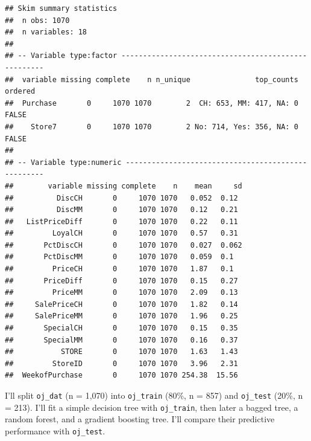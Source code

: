 \documentclass[]{book}
\newenvironment{Shaded}{\begin{snugshade}}{\end{snugshade}}
\newcommand{\DataTypeTok}[1]{\textcolor[rgb]{0.13,0.29,0.53}{#1}}
\newcommand{\DecValTok}[1]{\textcolor[rgb]{0.00,0.00,0.81}{#1}}
\newcommand{\FloatTok}[1]{\textcolor[rgb]{0.00,0.00,0.81}{#1}}
\newcommand{\KeywordTok}[1]{\textcolor[rgb]{0.13,0.29,0.53}{\textbf{#1}}}
\newcommand{\NormalTok}[1]{#1}
\newcommand{\OperatorTok}[1]{\textcolor[rgb]{0.81,0.36,0.00}{\textbf{#1}}}
\newcommand{\OtherTok}[1]{\textcolor[rgb]{0.56,0.35,0.01}{#1}}
\newcommand{\StringTok}[1]{\textcolor[rgb]{0.31,0.60,0.02}{#1}}
\begin{document}
\begin{verbatim}
## Skim summary statistics
##  n obs: 1070 
##  n variables: 18 
## 
## -- Variable type:factor ----------------------------------------------------
##  variable missing complete    n n_unique               top_counts ordered
##  Purchase       0     1070 1070        2  CH: 653, MM: 417, NA: 0   FALSE
##    Store7       0     1070 1070        2 No: 714, Yes: 356, NA: 0   FALSE
## 
## -- Variable type:numeric ---------------------------------------------------
##        variable missing complete    n    mean     sd
##          DiscCH       0     1070 1070   0.052  0.12 
##          DiscMM       0     1070 1070   0.12   0.21 
##   ListPriceDiff       0     1070 1070   0.22   0.11 
##         LoyalCH       0     1070 1070   0.57   0.31 
##       PctDiscCH       0     1070 1070   0.027  0.062
##       PctDiscMM       0     1070 1070   0.059  0.1  
##         PriceCH       0     1070 1070   1.87   0.1  
##       PriceDiff       0     1070 1070   0.15   0.27 
##         PriceMM       0     1070 1070   2.09   0.13 
##     SalePriceCH       0     1070 1070   1.82   0.14 
##     SalePriceMM       0     1070 1070   1.96   0.25 
##       SpecialCH       0     1070 1070   0.15   0.35 
##       SpecialMM       0     1070 1070   0.16   0.37 
##           STORE       0     1070 1070   1.63   1.43 
##         StoreID       0     1070 1070   3.96   2.31 
##  WeekofPurchase       0     1070 1070 254.38  15.56
\end{verbatim}

I'll split \texttt{oj\_dat} (n = 1,070) into \texttt{oj\_train} (80\%, n = 857) and \texttt{oj\_test} (20\%, n = 213). I'll fit a simple decision tree with \texttt{oj\_train}, then later a bagged tree, a random forest, and a gradient boosting tree. I'll compare their predictive performance with \texttt{oj\_test}.

\begin{Shaded}
\end{Shaded}
\end{document}
